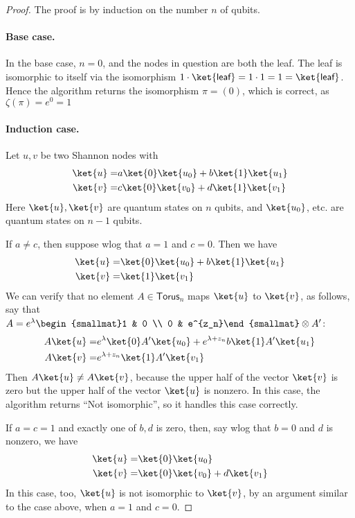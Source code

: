 \begin{proof}
	The proof is by induction on the number $n$ of qubits.
	\paragraph{Base case.}
	In the base case, $n=0$, and the nodes in question are both the \textsf{leaf}.
	The leaf is isomorphic to itself via the isomorphism
	$1\cdot \ket{\textsf{leaf}} = 1\cdot 1 = 1 = \ket{\textsf{leaf}}$.
	Hence the algorithm returns the isomorphism $\pi=(0)$, which is correct, as $\zeta(\pi)=e^0=1$
	
	\paragraph{Induction case.}
	Let $u,v$ be two Shannon nodes with
	\begin{align}
		\ket{u}=&a\ket{0}\ket{u_0}+b\ket{1}\ket{u_1} \\
		\ket{v}=&c\ket{0}\ket{v_0}+d\ket{1}\ket{v_1}
	\end{align}
	Here $\ket{u},\ket{v}$ are quantum states on $n$ qubits, and $\ket{u_0}$, etc. are quantum states on $n-1$ qubits.
	
	If $a\ne c$, then suppose wlog that $a=1$ and $c=0$.
	Then we have
	\begin{align}
		\ket{u}=& \ket{0}\ket{u_0}+b\ket{1}\ket{u_1} \\
		\ket{v}=& \ket{1}\ket{v_1}
	\end{align}
	We can verify that no element $A\in\textsf{Torus}_n$ maps $\ket{u}$ to $\ket{v}$, as follows, say that $A=e^\lambda \begin{smallmat}1 & 0 \\ 0 & e^{z_n}\end{smallmat}\otimes A^\prime$:
	\begin{align}
		A\ket{u} = & e^\lambda \ket{0}A^\prime\ket{u_0} + e^{\lambda+z_n} b\ket{1}A^\prime\ket{u_1} \\
		A\ket{v} = & e^{\lambda+z_n}\ket{1}A^\prime\ket{v_1}
	\end{align}
	Then $A\ket{u}\ne A\ket{v}$, because the upper half of the vector $\ket{v}$ is zero but the upper half of the vector $\ket{u}$ is nonzero.
	In this case, the algorithm returns ``Not isomorphic'', so it handles this case correctly.
	
	If $a=c=1$ and exactly one of $b,d$ is zero, then, say wlog that $b=0$ and $d$ is nonzero, we have
	\begin{align}
		\ket{u}=&\ket{0}\ket{u_0} \\
		\ket{v}=&\ket{0}\ket{v_0} + d\ket{v_1}
	\end{align}
	In this case, too, $\ket{u}$ is not isomorphic to $\ket{v}$, by an argument similar to the case above, when $a=1$ and $c=0$.
	

\end{proof}
